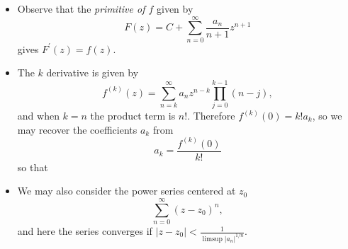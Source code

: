 \begin{remark}
  \begin{itemize}
    \item{
      Observe that the \emph{primitive of $f$} given by
      $$
      F(z) = C + \sum_{n=0}^\infty \frac{a_n}{n + 1} z^{n+1}
      $$
      gives $F^\prime(z) = f(z)$.
    }
    \item{
      The $k$ derivative is given by
      $$
      f^{(k)}(z) = \sum_{n=k}^\infty a_n z^{n-k} \prod_{j=0}^{k-1} (n - j),
      $$
      and when $k = n$ the product term is $n!$. Therefore
      $f^{(k)}(0) = k! a_k$, so we may recover the coefficients $a_k$ from
      $$
      a_k = \frac{f^{(k)}(0)}{k!}
      $$
      so that
    }
    \item{
      We may also consider the power series centered at $z_0$
      $$
      \sum_{n=0}^\infty (z - z_0)^n,
      $$
      and here the series converges if $|z - z_0| < \frac{1}{\limsup |a_n|^{1 / n}}$.
    }
  \end{itemize}
\end{remark}
